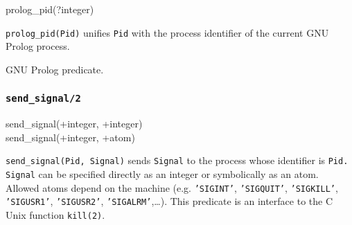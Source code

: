 \begin{TemplatesOneCol}
prolog\_pid(?integer)

\end{TemplatesOneCol}

\Description

\texttt{prolog\_pid(Pid)} unifies \texttt{Pid} with the process identifier
of the current GNU Prolog process.

\begin{PlErrors}


\end{PlErrors}

\Portability

GNU Prolog predicate.

\subsubsection{\texttt{send\_signal/2}}

\begin{TemplatesOneCol}
send\_signal(+integer, +integer)\\
send\_signal(+integer, +atom)

\end{TemplatesOneCol}

\Description

\texttt{send\_signal(Pid, Signal)} sends \texttt{Signal} to the process whose
identifier is \texttt{Pid.} \texttt{Signal} can be specified directly as an
integer or symbolically as an atom. Allowed atoms depend on the machine (e.g.
\texttt{'SIGINT'}, \texttt{'SIGQUIT'}, \texttt{'SIGKILL'},
\texttt{'SIGUSR1'}, \texttt{'SIGUSR2'}, \texttt{'SIGALRM'},\ldots). This
predicate is an interface to the C Unix function \texttt{kill(2)}.

\begin{PlErrors}






\end{PlErrors}

